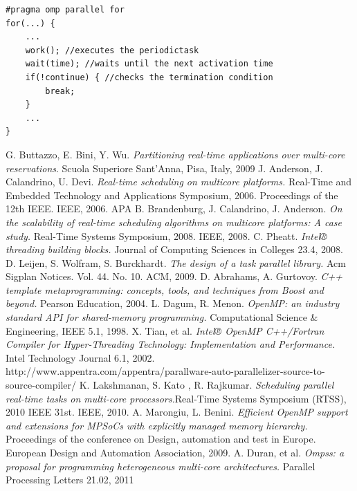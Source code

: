 \documentclass[a4paper,12pt,oneside]{book}
\begin{document}
\begin{lstlisting}[language=CCC, caption=Example of a periodic task., label=periodictask]
#pragma omp parallel for
for(...) {
	...
	work(); //executes the periodictask
	wait(time); //waits until the next activation time
	if(!continue) { //checks the termination condition
		break;
	}
	...
}

\end{lstlisting}

\begin{thebibliography}{30}
 G. Buttazzo, E. Bini, Y. Wu. \emph{Partitioning real-time applications over multi-core reservations}. Scuola Superiore Sant’Anna, Pisa, Italy, 2009
J. Anderson, J. Calandrino, U. Devi. \emph{Real-time scheduling on multicore platforms.} Real-Time and Embedded Technology and Applications Symposium, 2006. Proceedings of the 12th IEEE. IEEE, 2006.
APA	
B. Brandenburg, J. Calandrino,  J. Anderson. \emph{On the scalability of real-time scheduling algorithms on multicore platforms: A case study.} Real-Time Systems Symposium, 2008. IEEE, 2008.
 C. Pheatt. \emph{Intel® threading building blocks.} Journal of Computing Sciences in Colleges 23.4, 2008.
 D. Leijen, S. Wolfram, S. Burckhardt. \emph{The design of a task parallel library.} Acm Sigplan Notices. Vol. 44. No. 10. ACM, 2009.
 D. Abrahams, A. Gurtovoy. \emph{C++ template metaprogramming: concepts, tools, and techniques from Boost and beyond.} Pearson Education, 2004.
 L. Dagum, R. Menon. \emph{OpenMP: an industry standard API for shared-memory programming.} Computational Science \& Engineering, IEEE 5.1, 1998.
 X. Tian, et al. \emph{Intel® OpenMP C++/Fortran Compiler for Hyper-Threading Technology: Implementation and Performance.} Intel Technology Journal 6.1, 2002.
 http://www.appentra.com/appentra/parallware-auto-parallelizer-source-to-source-compiler/
K. Lakshmanan, S. Kato , R. Rajkumar. \emph{Scheduling parallel real-time tasks on multi-core processors.}Real-Time Systems Symposium (RTSS), 2010 IEEE 31st. IEEE, 2010.
A. Marongiu, L. Benini. \emph{Efficient OpenMP support and extensions for MPSoCs with explicitly managed memory hierarchy.} Proceedings of the conference on Design, automation and test in Europe. European Design and Automation Association, 2009.
 A. Duran, et al. \emph{Ompss: a proposal for programming heterogeneous multi-core architectures.} Parallel Processing Letters 21.02, 2011

\end{thebibliography}
\end{document}
